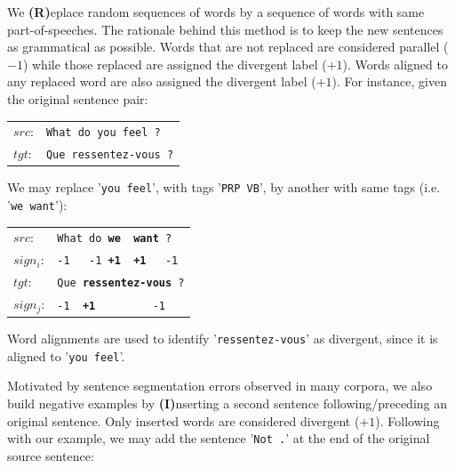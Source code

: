 \documentclass[11pt,a4paper]{article}
\begin{document}
We {\bf (R)}eplace random sequences of words by a sequence of words with same part-of-speeches. 
The rationale behind this method is to keep the new sentences as grammatical as possible. 
Words that are not replaced are considered parallel ($-1$) while those replaced are assigned the divergent label ($+1$). 
Words aligned to any replaced word are also assigned the divergent label ($+1$). For instance, given the original sentence pair:

\begin{table}[h]
\small
\center
\begin{tabular}{ll}
$src$: & { \small \texttt{What do you feel ?}} \\
$tgt$: & { \small \texttt{Que ressentez-vous ?}} \\
\end{tabular}
\end{table}

We may replace '\texttt{you feel}', with tags '\texttt{PRP VB}', by another with same tags (i.e. '\texttt{we want}'):

\begin{table}[h]
\small
\center
\begin{tabular}{ll}
$src$: & { \small \texttt{What do {\bf we \ want} ?}} \\
$sign_i$: & { \small \texttt{-1 \ \  -1 {\bf +1\ \ +1} \ \  -1}} \\
$tgt$: & { \small \texttt{Que {\bf ressentez-vous} ?}} \\
$sign_j$: & { \small \texttt{-1\ \ {\bf +1}\ \ \ \ \ \ \ \ \ -1}} \\
\end{tabular}
\end{table}

Word alignments are used to identify '\texttt{ressentez-vous}' as divergent, since it is aligned to '\texttt{you feel}'.

Motivated by sentence segmentation errors observed in many corpora, we also build negative examples by {\bf (I)}nserting a second sentence following/preceding an %
original sentence. Only inserted words are considered divergent ($+1$).
Following with our example, we may add the sentence '\texttt{Not .}' at the end of the original source sentence:
\end{document}

